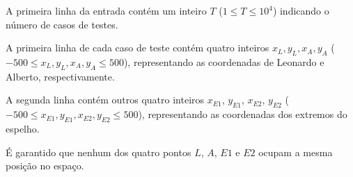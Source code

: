 A primeira linha da entrada contém um inteiro $T$ ($1 \le T \le 10^4$) indicando o número de casos de testes.

A primeira linha de cada caso de teste contém quatro inteiros $x_L, y_L, x_A, y_A$ ($-500 \le x_L, y_L, x_A, y_A \le 500$), representando as coordenadas de Leonardo e Alberto, respectivamente.

A segunda linha contém outros quatro inteiros $x_{E1}$, $y_{E1}$, $x_{E2}$, $y_{E2}$ ($-500 \le x_{E1}, y_{E1}, x_{E2}, y_{E2} \le 500$), representando as coordenadas dos extremos do espelho.

É garantido que nenhum dos quatro pontos $L$, $A$, $E1$ e $E2$ ocupam a mesma posição no espaço.